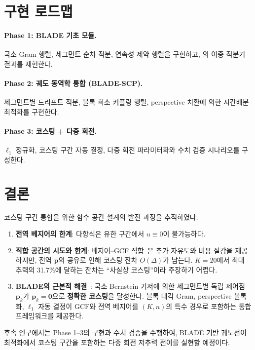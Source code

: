 \documentclass[11pt]{article}
\begin{document}
\section{구현 로드맵}
\label{sec:roadmap}

\paragraph{Phase 1: BLADE 기초 모듈.}
국소 Gram 행렬, 세그먼트 순차 적분, 연속성 제약 행렬을 구현하고,
\cite{efc005}의 이중 적분기 결과를 재현한다.

\paragraph{Phase 2: 궤도 동역학 통합 (BLADE-SCP).}
세그먼트별 드리프트 적분, 블록 희소 커플링 행렬,
perspective 치환에 의한 시간배분 최적화를 구현한다.

\paragraph{Phase 3: 코스팅 + 다중 회전.}
$\ell_1$ 정규화, 코스팅 구간 자동 결정,
다중 회전 파라미터화와 수치 검증 시나리오를 구성한다.


\section{결론}
\label{sec:conclusion}

코스팅 구간 통합을 위한 함수 공간 설계의 발전 과정을 추적하였다.

\begin{enumerate}
\item \textbf{전역 베지어의 한계}: 다항식은 유한 구간에서 $u \equiv 0$이 불가능하다.

\item \textbf{직합 공간의 시도와 한계}:
  베지어--GCF 직합~\cite{efc003}은 추가 자유도와 비용 절감을 제공하지만,
  전역 $\mathbf{p}$의 공유로 인해 코스팅 잔차 $O(\Delta)$가 남는다.
  $K{=}20$에서 최대 추력의 31.7\%에 달하는 잔차는
  ``사실상 코스팅''이라 주장하기 어렵다.

\item \textbf{BLADE의 근본적 해결}~\cite{efc005}:
  국소 Bernstein 기저에 의한 세그먼트별 독립 제어점 $\mathbf{p}_k$가
  $\mathbf{p}_k = \mathbf{0}$으로 \textbf{정확한 코스팅}을 달성한다.
  블록 대각 Gram, perspective 볼록화, $\ell_1$ 자동 결정이
  GCF와 전역 베지어를 $(K, n)$의 특수 경우로 포함하는
  통합 프레임워크를 제공한다.
\end{enumerate}

후속 연구에서는 Phase 1--3의 구현과 수치 검증을 수행하여,
BLADE 기반 궤도전이 최적화에서 코스팅 구간을 포함하는
다중 회전 저추력 전이를 실현할 예정이다.




\end{document}
